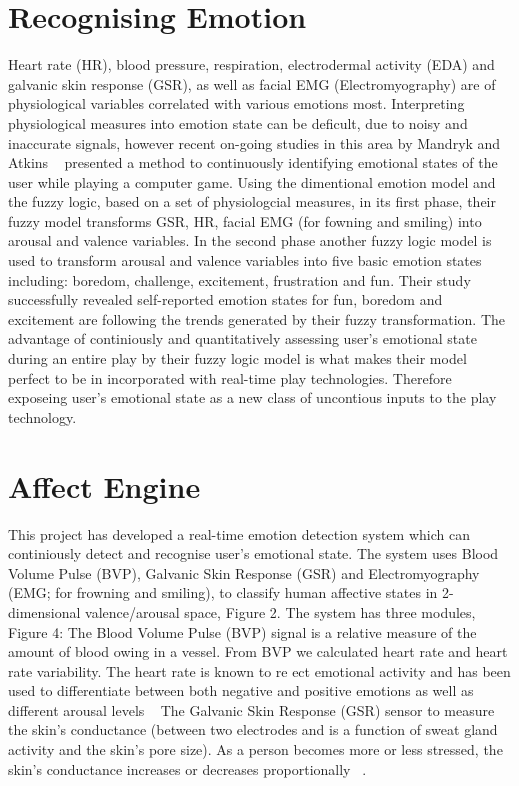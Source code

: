 
\section{Recognising Emotion}
Heart rate (HR), blood pressure, respiration, electrodermal
activity (EDA) and galvanic skin response (GSR), as well
as facial EMG (Electromyography) are of physiological variables 
correlated with various emotions most. Interpreting
physiological measures into emotion state can be deficult,
due to noisy and inaccurate signals, however recent on-going
studies in this area by Mandryk and Atkins ~\cite{mandryk2007fuzzy} presented a
method to continuously identifying emotional states of the
user while playing a computer game. Using the dimentional
emotion model and the fuzzy logic, based on a set of physiologcial 
measures, in its first phase, their fuzzy model transforms 
GSR, HR, facial EMG (for fowning and smiling) into
arousal and valence variables. In the second phase another
fuzzy logic model is used to transform arousal and valence
variables into five basic emotion states including: boredom,
challenge, excitement, frustration and fun. Their study successfully 
revealed self-reported emotion states for fun, boredom and excitement 
are following the trends generated by
their fuzzy transformation. The advantage of continiously
and quantitatively assessing user's emotional state during an
entire play by their fuzzy logic model is what makes their
model perfect to be in incorporated with real-time play technologies.
Therefore exposeing user's emotional state as a
new class of uncontious inputs to the play technology.

\section{Affect Engine}
This project has developed a real-time emotion detection
system which can continiously detect and recognise user's
emotional state. The system uses Blood Volume Pulse (BVP),
Galvanic Skin Response (GSR) and Electromyography (EMG;
for frowning and smiling), to classify human affective states
in 2-dimensional valence/arousal space, Figure 2.
The system has three modules, Figure 4:
The Blood Volume Pulse (BVP) signal is a relative measure
of the amount of blood 
owing in a vessel. From BVP we
calculated heart rate and heart rate variability. The heart
rate is known to re
ect emotional activity and has been used
to differentiate between both negative and positive emotions
as well as different arousal levels ~\cite{tt2013procomp}
The Galvanic Skin Response (GSR) sensor to measure the
skin's conductance (between two electrodes and is a function
of sweat gland activity and the skin's pore size). As a person
becomes more or less stressed, the skin's conductance
increases or decreases proportionally ~\cite{picard2003affective}.

